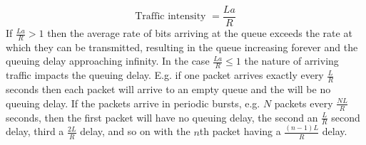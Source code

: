 $$
	\text{Traffic intensity }=\frac{La}{R}
$$
If $\frac{La}{R}>1$ then the average rate of bits arriving at the queue exceeds the rate at which they can be transmitted, resulting in the queue increasing forever and the queuing delay approaching infinity.
In the case $\frac{La}{R}\leq1$ the nature of arriving traffic impacts the queuing delay. E.g. if one packet arrives exactly every $\frac{L}{R}$ seconds then each packet will arrive to an empty queue and the will be no queuing delay. If the packets arrive in periodic bursts, e.g. $N$ packets every $\frac{NL}{R}$ seconds, then the first packet will have no queuing delay, the second an $\frac{L}{R}$ second delay, third a $\frac{2L}{R}$ delay, and so on with the $n$th packet having a $\frac{(n-1)L}{R}$ delay.
